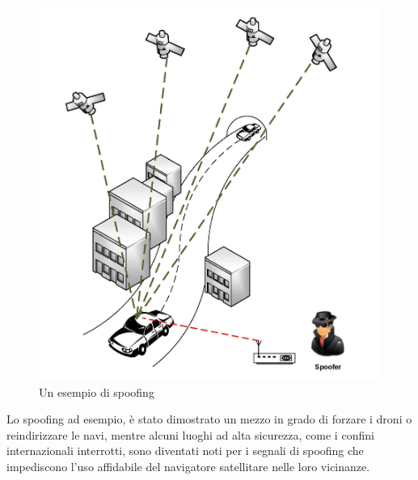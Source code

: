 \begin{figure}[h]
\centering
\includegraphics[scale=0.4]{images/Satnav_spoofing.jpg}
\caption{Un esempio di spoofing}
\label{fig: spoofing }
\end{figure}
Lo spoofing ad esempio, è stato dimostrato un mezzo in grado di forzare i droni o reindirizzare le navi, mentre alcuni luoghi ad alta sicurezza, come i confini internazionali interrotti, sono diventati noti per i segnali di spoofing che impediscono l'uso affidabile del navigatore satellitare nelle loro vicinanze. 

